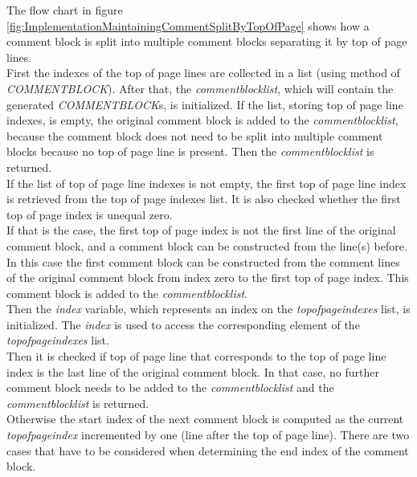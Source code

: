 The flow chart in figure \ref{fig:ImplementationMaintainingCommentSplitByTopOfPage} shows how a comment block is split into multiple comment blocks separating it by top of page lines.\\
First the indexes of the top of page lines are collected in a list (using method of \textit{COMMENT\textunderscore BLOCK}).
After that, the \textit{comment\textunderscore block\textunderscore list}, which will contain the generated \textit{COMMENT\textunderscore BLOCK}s, is initialized.
If the list, storing top of page line indexes, is empty, the original comment block is added to the \textit{comment\textunderscore block\textunderscore list}, because the comment block does not need to be split into multiple comment blocks because no top of page line is present.
Then the \textit{comment\textunderscore block\textunderscore list} is returned.\\
If the list of top of page line indexes is not empty, the first top of page line index is retrieved from the top of page indexes list.
It is also checked whether the first top of page index is unequal zero.\\
If that is the case, the first top of page index is not the first line of the original comment block, and a comment block can be constructed from the line(s) before.
In this case the first comment block can be constructed from the comment lines of the original comment block from index zero to the first top of page index.
This comment block is added to the \textit{comment\textunderscore block\textunderscore list}.\\
Then the \textit{index} variable, which represents an index on the \textit{top\textunderscore of\textunderscore page\textunderscore indexes} list, is initialized.
The \textit{index} is used to access the corresponding element of the \textit{top\textunderscore of\textunderscore page\textunderscore indexes} list.\\
Then it is checked if top of page line that corresponds to the top of page line index is the last line of the original comment block.
In that case, no further comment block needs to be added to the \textit{comment\textunderscore block\textunderscore list} and the \textit{comment\textunderscore block\textunderscore list} is returned.\\
Otherwise the start index of the next comment block is computed as the current \textit{top\textunderscore of\textunderscore page\textunderscore index} incremented by one (line after the top of page line).
There are two cases that have to be considered when determining the end index of the comment block.
